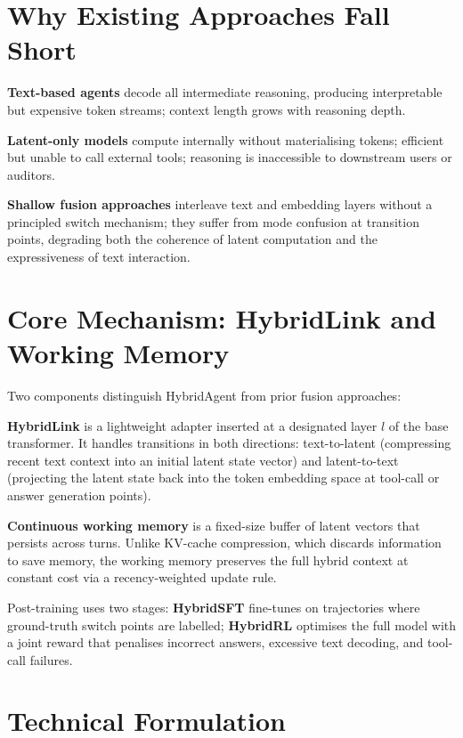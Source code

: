 \documentclass[10pt,twocolumn]{article}
\begin{document}
\section{Why Existing Approaches Fall Short}

\textbf{Text-based agents} decode all intermediate reasoning, producing
interpretable but expensive token streams; context length grows with
reasoning depth.

\textbf{Latent-only models} compute internally without materialising
tokens; efficient but unable to call external tools; reasoning is
inaccessible to downstream users or auditors.

\textbf{Shallow fusion approaches} interleave text and embedding layers
without a principled switch mechanism; they suffer from mode confusion at
transition points, degrading both the coherence of latent computation and
the expressiveness of text interaction.

\section{Core Mechanism: HybridLink and Working Memory}

Two components distinguish HybridAgent from prior fusion approaches:

\textbf{HybridLink} is a lightweight adapter inserted at a designated
layer $l$ of the base transformer. It handles transitions in both
directions: text-to-latent (compressing recent text context into an
initial latent state vector) and latent-to-text (projecting the latent
state back into the token embedding space at tool-call or answer
generation points).

\textbf{Continuous working memory} is a fixed-size buffer of latent
vectors that persists across turns. Unlike KV-cache compression, which
discards information to save memory, the working memory preserves the full
hybrid context at constant cost via a recency-weighted update rule.

Post-training uses two stages: \textbf{HybridSFT} fine-tunes on
trajectories where ground-truth switch points are labelled; \textbf{HybridRL}
optimises the full model with a joint reward that penalises incorrect
answers, excessive text decoding, and tool-call failures.

\section{Technical Formulation}
\end{document}
